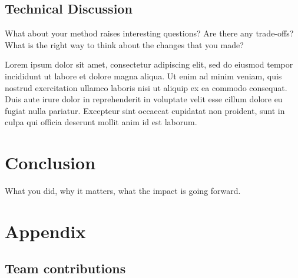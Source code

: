 \subsection{Technical Discussion}

What about your method raises interesting questions? Are there any trade-offs? What is the right way to think about the changes that you made?

Lorem ipsum dolor sit amet, consectetur adipiscing elit, sed do eiusmod tempor incididunt ut labore et dolore magna aliqua. Ut enim ad minim veniam, quis nostrud exercitation ullamco laboris nisi ut aliquip ex ea commodo consequat. Duis aute irure dolor in reprehenderit in voluptate velit esse cillum dolore eu fugiat nulla pariatur. Excepteur sint occaecat cupidatat non proident, sunt in culpa qui officia deserunt mollit anim id est laborum.

\section{Conclusion}

What you did, why it matters, what the impact is going forward.

{\small


}

\section*{Appendix}

\subsection*{Team contributions}

